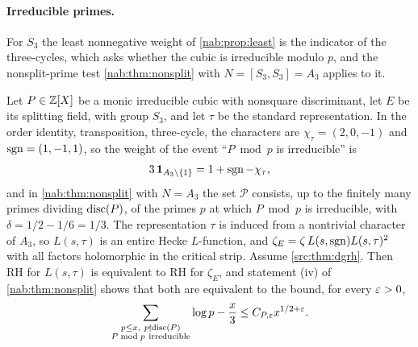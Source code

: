 \paragraph{Irreducible primes.}
For $S_3$ the least nonnegative weight of \cref{nab:prop:least} is the indicator of the three-cycles,
which asks whether the cubic is irreducible modulo $p$, and the nonsplit-prime test
\cref{nab:thm:nonsplit} with $N=[S_3,S_3]=A_3$ applies to it.

\begin{example}\label{hec:thm:irred}
Let $P\in\mathbb{Z}[X]$ be a monic irreducible cubic with nonsquare discriminant, let $E$ be its splitting field,
with group $S_3$, and let $\tau$ be the standard representation. In the order identity, transposition,
three-cycle, the characters are $\chi_\tau=(2,0,-1)$ and $\operatorname{sgn}=(1,-1,1)$, so the weight of the event
``$P\bmod p$ is irreducible'' is
\[
 3\,\mathbf{1}_{A_3\setminus\{1\}}=1+\operatorname{sgn}-\chi_\tau ,
\]
and in \cref{nab:thm:nonsplit} with $N=A_3$ the set $\mathcal P$ consists, up to the finitely many primes
dividing $\operatorname{disc}(P)$, of the primes $p$ at which $P\bmod p$ is irreducible, with $\delta=1/2-1/6=1/3$. The
representation $\tau$ is induced from a nontrivial character of $A_3$, so $L(s,\tau)$ is an entire Hecke
$L$-function, and $\zeta_E=\zeta\,L(s,\operatorname{sgn})L(s,\tau)^2$ with all factors holomorphic in the critical
strip. Assume \cref{src:thm:dgrh}. Then RH for $L(s,\tau)$ is equivalent to RH for $\zeta_E$, and
statement (iv) of \cref{nab:thm:nonsplit} shows that both are equivalent to the bound, for every
$\varepsilon>0$,
\begin{equation}\label{hec:eq:irredP}
 \sum_{\substack{p\le x,\ p\nmid\disc(P)\\ P\bmod p\ \mathrm{irreducible}}}\log p-\frac x3\le C_{P,\eps}x^{1/2+\eps}.
\end{equation}
\end{example}

